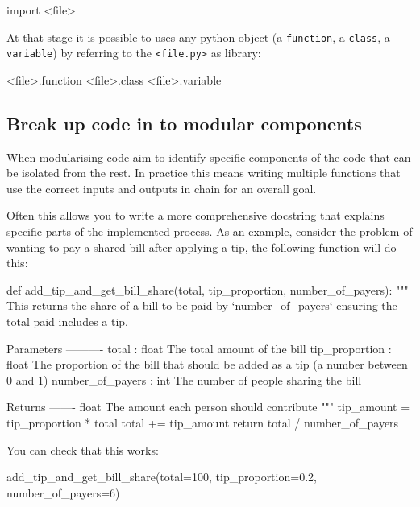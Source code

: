 \begin{pyin}
import <file>
\end{pyin}



At that stage it is possible to uses any python object (a \texttt{function}, a
\texttt{class}, a
\texttt{variable}) by referring to the \texttt{<file.py>} as library:

\begin{pyin}
<file>.function
<file>.class
<file>.variable
\end{pyin}


\subsection{Break up code in to modular components}
\label{\detokenize{building-tools/05-modularisation/how/main:how-to-break-up-code-in-to-modular-components}}

When modularising code aim to identify specific components of the code that can
be isolated from the rest.
In practice this means writing multiple functions that use the correct inputs
and outputs in chain for an overall goal.


Often this allows you to write a more comprehensive docstring that explains
specific parts of the implemented process.
As an example, consider the problem of wanting to pay a shared bill after
applying a tip, the following function will do this:




\begin{pyin}
def add_tip_and_get_bill_share(total, tip_proportion, number_of_payers):
    """
    This returns the share of a bill to be paid by `number_of_payers`
    ensuring the total paid includes a tip.

    Parameters
    ----------
    total : float
        The total amount of the bill
    tip_proportion : float
        The proportion of the bill that should be added as a tip (a number
        between 0 and 1)
    number_of_payers : int
        The number of people sharing the bill

    Returns
    -------
    float
        The amount each person should contribute
    """
    tip_amount = tip_proportion * total
    total += tip_amount
    return total / number_of_payers
\end{pyin}

You can check that this works:

\begin{pyin}
add_tip_and_get_bill_share(total=100, tip_proportion=0.2, number_of_payers=6)
\end{pyin}






